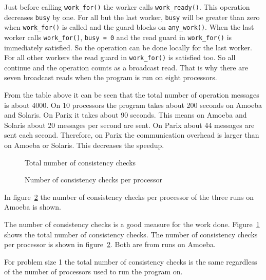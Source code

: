 \documentclass[a4paper,11pt]{article}
\begin{document}
Just before calling {\tt work\_for()} the worker calls
{\tt work\_ready()}. This operation decreases {\tt busy} by one.
For all but the last worker, {\tt busy} will be greater than zero
when {\tt work\_for()} is called and the guard blocks on {\tt any\_work()}.
When the last worker calls {\tt work\_for()}, {\tt busy = 0} and
the read guard in {\tt work\_for()} is immediately satisfied. So the
operation can be done locally for the last worker. For all other
workers the read guard in {\tt work\_for()} is satisfied too. So all
continue and the operation counts as a broadcast read. That is why
there are seven broadcast reads when the program is run on eight
processors.

From the table above it can be seen that the total number of
operation messages is about 4000. On 10 processors
the program takes about 200 seconds on Amoeba and
Solaris. On Parix it takes about 90 seconds.
This means on Amoeba and Solaris about 20 messages per second are sent.
On Parix about 44 messages are sent each second.
Therefore, on Parix the communication overhead is larger than
on Amoeba or Solaris. This decreases the speedup.

\begin{figure}
\begin{center}
\caption{Total number of consistency checks}
\label{fig:zoo-con-checks}
\end{center}
\end{figure}

\begin{figure}
\begin{center}
\caption{Number of consistency checks per processor}
\label{fig:zoo-checks-per-processor}
\end{center}
\end{figure}

In
figure~\ref{fig:zoo-checks-per-processor} the number of consistency checks
per processor of the three runs on Amoeba is shown.

The number of consistency checks is a good measure for the
work done. Figure~\ref{fig:zoo-con-checks} shows the total number of
consistency checks. The number of consistency checks per processor is
shown in figure~\ref{fig:zoo-checks-per-processor}. Both are from runs
on Amoeba.

For problem size 1 the total number of consistency
checks is the same regardless of the number of 
processors used to run the program on.
\end{document}

